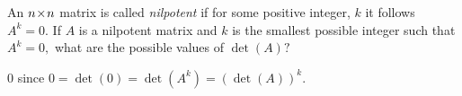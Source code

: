 
\begin{Exercise}[
name={},
title={}, 
difficulty=0,
origin={\cite{KK}}]
An $n \! \times \! n$ matrix is called \emph{nilpotent} if for some positive integer, 
$k$ it follows $A^{k}=0.$ If
$A$ is a nilpotent matrix and $k$ is the smallest possible integer such that
$A^{k}=0,$ what are the possible values of $\det \left( A\right) ?$ 
\end{Exercise}

\begin{Answer}
$0$ since $0=\det \left( 0\right) =\det \left( A^{k}\right) =\left( \det
\left( A\right) \right) ^{k}.$

\end{Answer}
